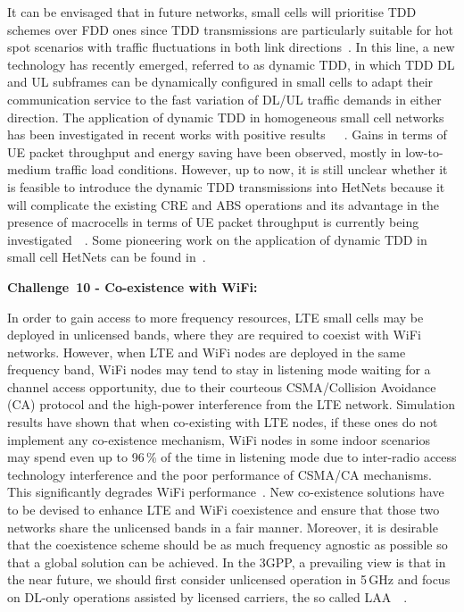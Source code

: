 \documentclass{IEEEtran}
\begin{document}
It can be envisaged that in future networks,
small cells will prioritise \ac{TDD} schemes over \ac{FDD} ones
since \ac{TDD} transmissions are particularly suitable for hot spot scenarios with traffic fluctuations in both link directions~\cite{TR36828}.
In this line, a new technology has recently emerged,
referred to as dynamic \ac{TDD},
in which \ac{TDD} \ac{DL} and \ac{UL} subframes can be dynamically configured in small cells to adapt their communication service to the fast variation of \ac{DL}/\ac{UL} traffic demands in either direction.
The application of dynamic \ac{TDD} in homogeneous small cell networks has been investigated in recent works with positive results~\cite{6353682}~\cite{DavidLopez2014homoDynamicTdd}~\cite{DavidLopez2015homoDynamicTdd}.
Gains in terms of \ac{UE} packet throughput and energy saving have been observed,
mostly in low-to-medium traffic load conditions.
However, up to now, it is still unclear whether it is feasible to introduce the dynamic \ac{TDD} transmissions into \acp{HetNet}
because it will complicate the existing \ac{CRE} and \ac{ABS} operations and its advantage in the presence of macrocells in terms of UE packet throughput is currently being investigated~\cite{DavidLopez2014hetnetDynamicTdd}~\cite{TR36828}.
Some pioneering work on the application of dynamic TDD in small cell HetNets can be found in~\cite{DavidLopez2014hetnetDynamicTdd}.


{\bf Challenge~10 - Co-existence with WiFi:}

In order to gain access to more frequency resources,
\ac{LTE} small cells may be deployed in unlicensed bands, where they are required to coexist with \ac{WiFi} networks.
However, when \ac{LTE} and \ac{WiFi} nodes are deployed in the same frequency band,
\ac{WiFi} nodes may tend to stay in listening mode waiting for a channel access opportunity,
due to their courteous \ac{CSMA}/Collision Avoidance (CA) protocol and the high-power interference from the \ac{LTE} network.
Simulation results have shown that when co-existing with \ac{LTE} nodes,
if these ones do not implement any co-existence mechanism,
\ac{WiFi} nodes in some indoor scenarios may spend even up to 96\,\% of the time in listening mode due to inter-radio access technology interference and the poor performance of \ac{CSMA}/CA mechanisms.
This significantly degrades \ac{WiFi} performance~\cite{6692702}.
New co-existence solutions have to be devised to enhance \ac{LTE} and \ac{WiFi} coexistence and ensure that those two networks share the unlicensed bands in a fair manner.
Moreover, it is desirable that the coexistence scheme should be as much frequency agnostic as possible
so that a global solution can be achieved.
In the \ac{3GPP}, a prevailing view is that in the near future,
we should first consider unlicensed operation in 5\,GHz and focus on \ac{DL}-only operations assisted by licensed carriers,
the so called \ac{LAA}~\cite{TR36889}~\cite{LTE-U}.
\end{document}
